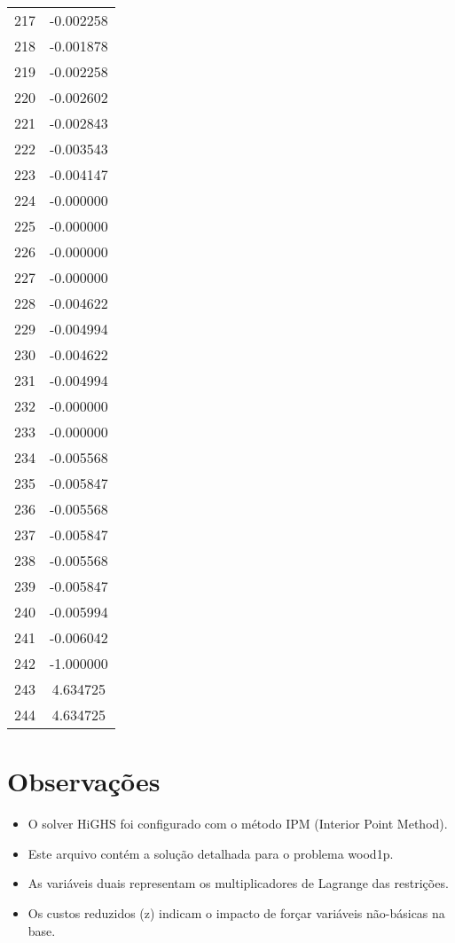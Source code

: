 \documentclass[12pt]{article}
\begin{document}
\begin{longtable}{@{}cc@{}}
217 & -0.002258 \\
218 & -0.001878 \\
219 & -0.002258 \\
220 & -0.002602 \\
221 & -0.002843 \\
222 & -0.003543 \\
223 & -0.004147 \\
224 & -0.000000 \\
225 & -0.000000 \\
226 & -0.000000 \\
227 & -0.000000 \\
228 & -0.004622 \\
229 & -0.004994 \\
230 & -0.004622 \\
231 & -0.004994 \\
232 & -0.000000 \\
233 & -0.000000 \\
234 & -0.005568 \\
235 & -0.005847 \\
236 & -0.005568 \\
237 & -0.005847 \\
238 & -0.005568 \\
239 & -0.005847 \\
240 & -0.005994 \\
241 & -0.006042 \\
242 & -1.000000 \\
243 & 4.634725 \\
244 & 4.634725 \\

\end{longtable}


\section{Observações}

\begin{itemize}
\item O solver HiGHS foi configurado com o método IPM (Interior Point Method).
\item Este arquivo contém a solução detalhada para o problema wood1p.
\item As variáveis duais representam os multiplicadores de Lagrange das restrições.
\item Os custos reduzidos (z) indicam o impacto de forçar variáveis não-básicas na base.
\end{itemize}
\end{document}

